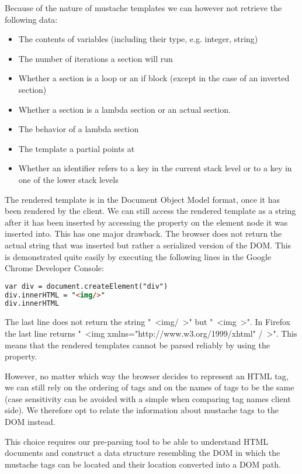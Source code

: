 \documentclass[thesis.tex]{subfiles}
\begin{document}
Because of the nature of mustache templates we can however not retrieve the
following data:

\begin{itemize}
\item The contents of variables (including their type, e.g. integer, string)
\item The number of iterations a section will run
\item Whether a section is a loop or an if block
      (except in the case of an inverted section)
\item Whether a section is a lambda section or an actual section.
\item The behavior of a lambda section
\item The template a partial points at
\item Whether an identifier refers to a key in the current stack level or
      to a key in one of the lower stack levels
\end{itemize}

The rendered template is in the Document Object Model format, once it has
been rendered by the client. We can still access the rendered template as a
string after it has been inserted by accessing the  property
on the element node it was inserted into. This has one major drawback.
The browser does not return the actual string that was inserted but rather a
serialized version of the DOM. This is demonstrated quite easily by executing
the following lines in the Google Chrome Developer Console:
\begin{lstlisting}[language=HTML]
var div = document.createElement("div")
div.innerHTML = "<img/>"
div.innerHTML
\end{lstlisting}

The last line does not return the string "\ <img/\ >" but "\ <img\ >".
In Firefox the last line returns "\ <img xmlns="http://www.w3.org/1999/xhtml" /\ >".
This means that the rendered templates cannot be parsed reliably by using the
 property.

However, no matter which way the browser decides to represent an HTML tag,
we can still rely on the ordering of tags and on the names of tags to be the same
(case sensitivity can be avoided with a simple
 when comparing tag names client side).
We therefore opt to relate the information about mustache tags to the DOM instead.

This choice requires our pre-parsing tool to be able to understand
HTML documents and construct a data structure resembling the DOM in which the
mustache tags can be located and their location converted into a DOM path.
\end{document}

